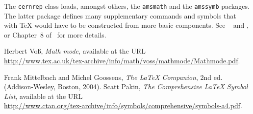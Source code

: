 \documentclass{cernrep}
\begin{document}
The \texttt{cernrep} class loads, amongst others, the \texttt{amsmath}
and the \texttt{amssymb} packages. The latter package defines many
supplementary commands and symbols that with \TeX{} would have to be
constructed from more basic components. See \Refs~\cite{bib:voss2005}
and \cite{bib:pakin2003}, or Chapter~8 of~
for more details.

\begin{thebibliography}{99}
 Herbert Vo{\ss},
  \emph{Math mode}, available at the URL\\
\url{http://www.tex.ac.uk/tex-archive/info/math/voss/mathmode/Mathmode.pdf}.

 Frank Mittelbach and Michel Goossens,
  \emph{The \LaTeX{} Companion}, 2nd ed. (Addison-Wesley, Boston,
  2004).
 Scatt Pakin,
  \emph{The Comprehensive \LaTeX{} Symbol List}, available at the URL\\
\url{http://www.ctan.org/tex-archive/info/symbols/comprehensive/symbols-a4.pdf}.
\end{thebibliography}
\end{document}
